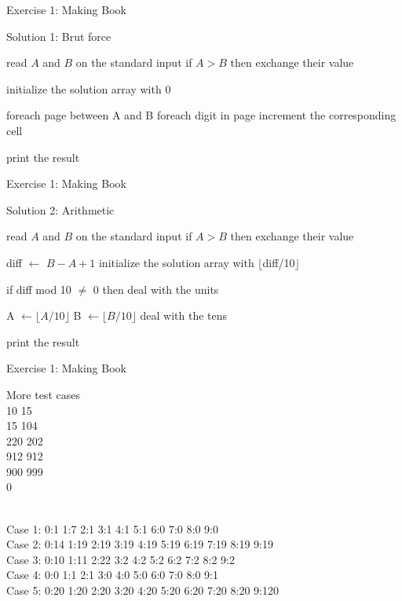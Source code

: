 \documentclass{beamer}
\begin{document}
\begin{frame}[fragile]{Exercise 1: Making Book}

  \begin{code}{Solution 1: Brut force}
    \begin{PseudoCode}
read $A$ and $B$ on the standard input
if $A > B$ then 
    exchange their value

initialize the solution array with 0

foreach page between A and B
    foreach digit in page
        increment the corresponding cell

print the result
    \end{PseudoCode}
  \end{code}
\end{frame}

\begin{frame}[fragile]{Exercise 1: Making Book}
  
  \begin{code}{Solution 2: Arithmetic}
    \begin{PseudoCode}
read $A$ and $B$ on the standard input
if $A > B$ then exchange their value

diff $\leftarrow$ $B - A + 1$
initialize the solution array with $\lfloor$diff/10$\rfloor$
    
if diff mod 10 $\neq$ 0 then
    deal with the units
    
A $\leftarrow \lfloor A / 10 \rfloor$
B $\leftarrow \lfloor B / 10 \rfloor$
deal with the tens

print the result
    \end{PseudoCode}
  \end{code}
\end{frame}

\begin{frame}{Exercise 1: Making Book}

  \begin{exampleblock}{More test cases}
    \\
    10 15\\
    15 104\\
    220 202\\
    912 912\\
    900 999\\
    0
    
    \medskip
    \\
    Case 1: 0:1 1:7 2:1 3:1 4:1 5:1 6:0 7:0 8:0 9:0\\
    Case 2: 0:14 1:19 2:19 3:19 4:19 5:19 6:19 7:19 8:19 9:19\\
    Case 3: 0:10 1:11 2:22 3:2 4:2 5:2 6:2 7:2 8:2 9:2\\
    Case 4: 0:0 1:1 2:1 3:0 4:0 5:0 6:0 7:0 8:0 9:1\\
    Case 5: 0:20 1:20 2:20 3:20 4:20 5:20 6:20 7:20 8:20 9:120
  \end{exampleblock}
\end{frame}
\end{document}
